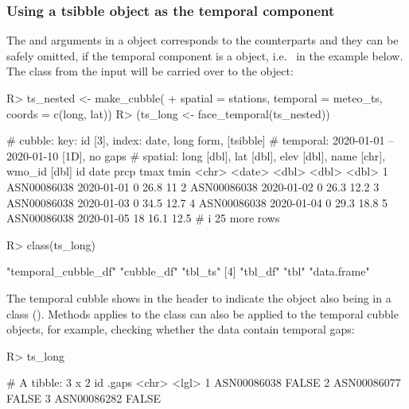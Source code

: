 \documentclass[
]{jss}
\begin{document}
\hypertarget{using-a-tsibble-object-as-the-temporal-component}{%
\subsubsection{Using a tsibble object as the temporal
component}\label{using-a-tsibble-object-as-the-temporal-component}}

The  and  arguments in a  object
corresponds to the  counterparts and they can be safely
omitted, if the temporal component is a  object,
i.e.~ in the example below. The  class from
the input will be carried over to the  object:

\begin{CodeChunk}
\begin{CodeInput}
R> ts_nested <- make_cubble(
+   spatial = stations, temporal = meteo_ts, coords = c(long, lat))
R> (ts_long <- face_temporal(ts_nested))
\end{CodeInput}
\begin{CodeOutput}
# cubble:   key: id [3], index: date, long form, [tsibble]
# temporal: 2020-01-01 -- 2020-01-10 [1D], no gaps
# spatial:  long [dbl], lat [dbl], elev [dbl], name [chr], wmo_id [dbl]
  id          date        prcp  tmax  tmin
  <chr>       <date>     <dbl> <dbl> <dbl>
1 ASN00086038 2020-01-01     0  26.8  11  
2 ASN00086038 2020-01-02     0  26.3  12.2
3 ASN00086038 2020-01-03     0  34.5  12.7
4 ASN00086038 2020-01-04     0  29.3  18.8
5 ASN00086038 2020-01-05    18  16.1  12.5
# i 25 more rows
\end{CodeOutput}
\begin{CodeInput}
R> class(ts_long)
\end{CodeInput}
\begin{CodeOutput}
[1] "temporal_cubble_df" "cubble_df"          "tbl_ts"            
[4] "tbl_df"             "tbl"                "data.frame"        
\end{CodeOutput}
\end{CodeChunk}

The temporal cubble shows \code{[tsibble]} in the header to indicate the
object also being in a  class (). Methods
applies to the  class can also be applied to the temporal
cubble objects, for example, checking whether the data contain temporal
gaps:

\begin{CodeChunk}
\begin{CodeInput}
R> ts_long %
\end{CodeInput}
\begin{CodeOutput}
# A tibble: 3 x 2
  id          .gaps
  <chr>       <lgl>
1 ASN00086038 FALSE
2 ASN00086077 FALSE
3 ASN00086282 FALSE
\end{CodeOutput}
\end{CodeChunk}
\end{document}
